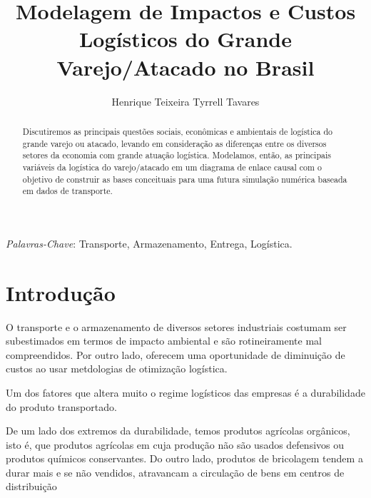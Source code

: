 \documentclass[]{article}
\title{Modelagem de Impactos e Custos Logísticos do Grande Varejo/Atacado no Brasil}
\author{Henrique Teixeira Tyrrell Tavares}
\begin{document}
\maketitle

\begin{abstract}

\end{abstract}

\section{}


	
%		
%	
	
	
	\begin{abstract}
		Discutiremos as principais questões sociais, econômicas e ambientais de logística do grande varejo ou atacado, levando em consideração as diferenças entre os diversos setores da economia com grande atuação logística. Modelamos, então, as principais variáveis da logística do varejo/atacado em um diagrama de enlace causal com o objetivo de construir as bases conceituais para uma futura simulação numérica baseada em dados de transporte. 
	\end{abstract}
	
	\textit{Palavras-Chave}: Transporte, Armazenamento, Entrega, Logística.
	
	\section{Introdução}
	
	O transporte e o armazenamento de diversos setores industriais costumam ser subestimados em termos de impacto ambiental e são rotineiramente mal compreendidos. Por outro lado, oferecem uma oportunidade de diminuição de custos ao usar metdologias de otimização logística. 
	
	Um dos fatores que altera muito o regime logísticos das empresas é a durabilidade do produto transportado. 
	
	De um lado dos extremos da durabilidade, temos produtos agrícolas orgânicos, isto é, que produtos agrícolas em cuja produção não são usados defensivos ou produtos químicos conservantes. Do outro lado, produtos de bricolagem tendem a durar mais e se não vendidos, atravancam a circulação de bens em centros de distribuição 
	
\end{document}
